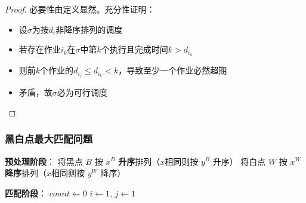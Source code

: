 \documentclass[./../main.tex]{subfiles}
\begin{document}
\begin{proof}
必要性由定义显然。充分性证明：
\begin{itemize}
\item 设$\sigma$为按$d_i$非降序排列的调度
\item 若存在作业$i_k$在$\sigma$中第$k$个执行且完成时间$k > d_{i_k}$
\item 则前$k$个作业的$d_{i_j} \leq d_{i_k} < k$，导致至少一个作业必然超期
\item 矛盾，故$\sigma$必为可行调度
\end{itemize}
\end{proof}


\subsubsection{黑白点最大匹配问题}
\begin{algorithm}[H]
\caption{黑白点最大匹配算法}

\BlankLine
\textbf{预处理阶段}：
将黑点 $B$ 按 $x^B$ \textbf{升序}排列（$x$相同则按 $y^B$ 升序）\;
将白点 $W$ 按 $x^W$ \textbf{降序}排列（$x$相同则按 $y^W$ 降序）\;

\BlankLine
\textbf{匹配阶段}：
$count \gets 0$\;
$i \gets 1$, $j \gets 1$\;

\;
\end{algorithm}
\end{document}
